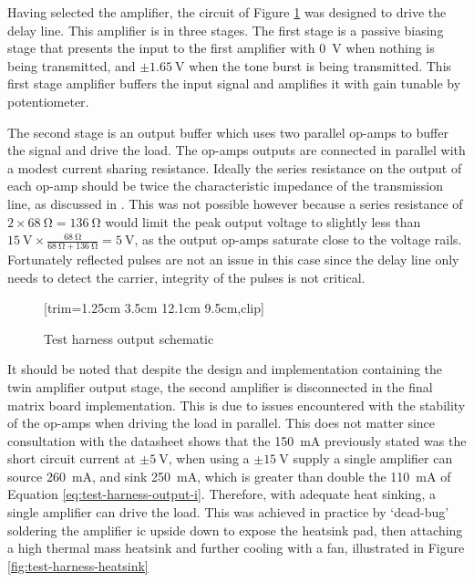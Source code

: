 Having selected the amplifier, the circuit of Figure \ref{fig:test-harness-output-sch} was designed to drive the delay line. This amplifier is in three stages. The first stage is a passive biasing stage that presents the input to the first amplifier with \SI{0}{\volt} when nothing is being transmitted, and $\pm \SI{1.65}{\volt}$ when the tone burst is being transmitted. This first stage amplifier buffers the input signal and amplifies it with gain tunable by potentiometer.

The second stage is an output buffer which uses two parallel op-amps to buffer the signal and drive the load. The op-amps outputs are connected in parallel with a modest current sharing resistance. Ideally the series resistance on the output of each op-amp should be twice the characteristic impedance of the transmission line, as discussed in \cite{intersil2005}. This was not possible however because a series resistance of $2 \times \SI{68}{\ohm} = \SI{136}{\ohm}$ would limit the peak output voltage to slightly less than $\SI{15}{\volt} \times \frac{\SI{68}{\ohm}}{\SI{68}{\ohm} + \SI{136}{\ohm}} = \SI{5}{\volt}$, as the output op-amps saturate close to the voltage rails. Fortunately reflected pulses are not an issue in this case since the delay line only needs to detect the carrier, integrity of the pulses is not critical.

\begin{figure}[ht]
	\centering
	[trim={1.25cm 3.5cm 12.1cm 9.5cm},clip] %
	\caption{Test harness output schematic}
	\label{fig:test-harness-output-sch}
\end{figure}

It should be noted that despite the design and implementation containing the twin amplifier output stage, the second amplifier is disconnected in the final matrix board implementation. This is due to issues encountered with the stability of the op-amps when driving the load in parallel. This does not matter since consultation with the datasheet shows that the \SI{150}{\milli\ampere} previously stated was the short circuit current at $\pm \SI{5}{\volt}$, when using a $\pm \SI{15}{\volt}$ supply a single amplifier can source \SI{260}{\milli\ampere}, and sink \SI{250}{\milli\ampere}, which is greater than double the \SI{110}{\milli\ampere} of Equation \ref{eq:test-harness-output-i}. Therefore, with adequate heat sinking, a single amplifier can drive the load. This was achieved in practice by `dead-bug' soldering the amplifier \gls{ic} upside down to expose the heatsink pad, then attaching a high thermal mass heatsink and further cooling with a fan, illustrated in Figure \ref{fig:test-harness-heatsink}

